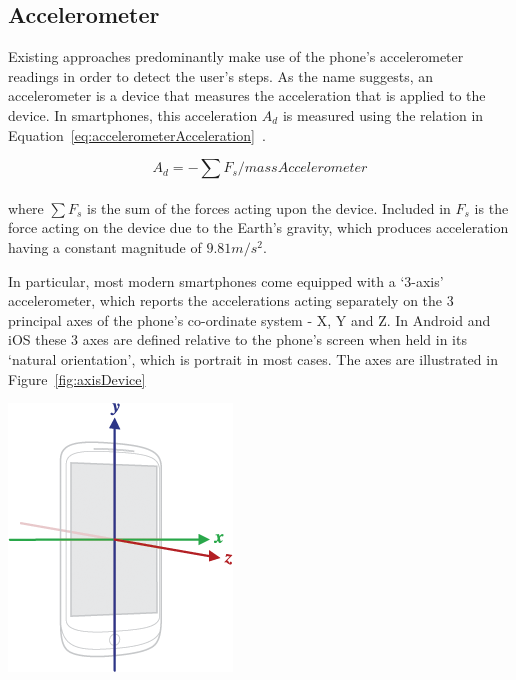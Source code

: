 \documentclass[main.tex]{subfiles}
\begin{document}
\subsection{Accelerometer}
Existing approaches predominantly make use of the phone's accelerometer readings in order to detect the user's steps. As the name suggests, an accelerometer is a device that measures the acceleration that is applied to the device. In smartphones, this acceleration $A_{d}$ is measured using the relation in 
Equation~\ref{eq:accelerometerAcceleration}~\cite{accelerometerAcceleration}.  

\begin{equation}\label{eq:accelerometerAcceleration}
A_{d} = - \sum F_{s}/massAccelerometer
\end{equation}
\\
where $\sum F_{s}$ is the sum of the forces acting upon the device. Included in $F_{s}$ is the force acting on the device due to the Earth's gravity, which produces acceleration having a constant magnitude of $9.81 m/s^2$. 

In particular, most modern smartphones come equipped with a `3-axis' accelerometer, which reports the accelerations acting separately on the 3 principal axes of the phone's co-ordinate system - X, Y and Z. In Android and iOS these 3 axes are defined relative to the phone's screen when held in its `natural orientation', which is portrait in most cases. The axes are illustrated in Figure~\ref{fig:axisDevice}

\begin{center}
\includegraphics[scale=0.5]{images/axisDevice.png}
\label{fig:axisDevice}
\end{center}
\end{document}
